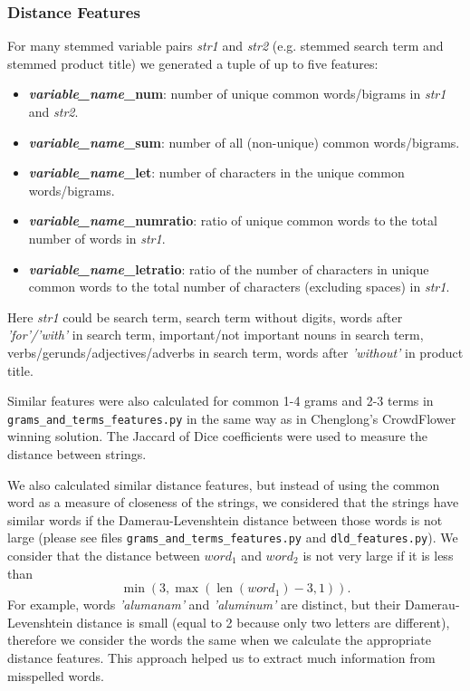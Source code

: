 \documentclass[12pt]{article}
\DeclareMathOperator{\len}{len}
\begin{document}
\subsubsection{Distance Features}
\label{subsubsec:Distance_Features_IandK}
For many stemmed variable pairs \emph{str1} and \emph{str2} (e.g. stemmed search term and stemmed product title) we generated a tuple of up to five features:
\begin{itemize}
\item \textbf{\emph{variable\_name}\_num}: number of unique common words/bigrams in \emph{str1} and \emph{str2}.
\item \textbf{\emph{variable\_name}\_sum}: number of all (non-unique) common words/bigrams.
\item \textbf{\emph{variable\_name}\_let}: number of characters in the unique common words/bigrams.
\item \textbf{\emph{variable\_name}\_numratio}: ratio of unique common words to the total number of words in \emph{str1}.
\item \textbf{\emph{variable\_name}\_letratio}: ratio of the number of characters in unique common words to the total number of characters (excluding spaces) in \emph{str1}.
\end{itemize}
Here \emph{str1} could be search term, search term without digits, words after \emph{'for'/'with'} in search term, important/not important nouns in search term, verbs/gerunds/adjectives/adverbs in search term, words after \emph{'without'} in product title.

Similar features were also calculated for common 1-4 grams and 2-3 terms in \texttt{grams\_and\_terms\_features.py} in the same way as in Chenglong's CrowdFlower winning solution. The Jaccard of Dice coefficients were used to measure the distance between strings.

We also calculated similar distance features, but instead of using the common word
as a measure of closeness of the strings, we considered that the strings have similar
words if the Damerau-Levenshtein distance between those words is not large (please see
files \texttt{grams\_and\_terms\_features.py} and \texttt{dld\_features.py}). We consider that the distance between $word_1$ and $word_2$ is not very large if it is less than
 $$\min\left(3,\max\left(\len(word_1)-3,1\right)\right).$$
For example, words \emph{'alumanam'} and \emph{'aluminum'}
are distinct, but their Damerau-Levenshtein distance is small (equal to 2 because only
two letters are different), therefore we consider the words the same when we calculate the
appropriate distance features. This approach helped us to extract much information
from misspelled words.
\end{document}
